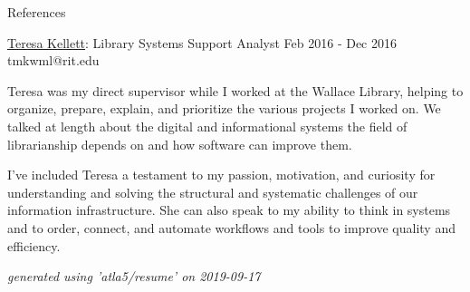 \documentclass{resume} %
\begin{document}
\begin{rSection}{References}
\begin{rSubsection}{\underline{Teresa Kellett}: Library Systems Support Analyst }{ Feb 2016 - Dec 2016 }{tmkwml@rit.edu}
      \item Teresa was my direct supervisor while I worked at the Wallace Library, helping to organize, prepare, explain, and prioritize the various projects I worked on. We talked at length about the digital and informational systems the field of librarianship depends on and how software can improve them. \newline

      \item I've included Teresa a testament to my passion, motivation, and curiosity for understanding and solving the structural and systematic challenges of our information infrastructure. She can also speak to my ability to think in systems and to order, connect, and automate workflows and tools to improve quality and efficiency. \newline

    \end{rSubsection}

  \end{rSection}

  \begin{flushright}
    \em{generated using 'atla5/resume' on 2019-09-17}
  \end{flushright}
\end{document}

